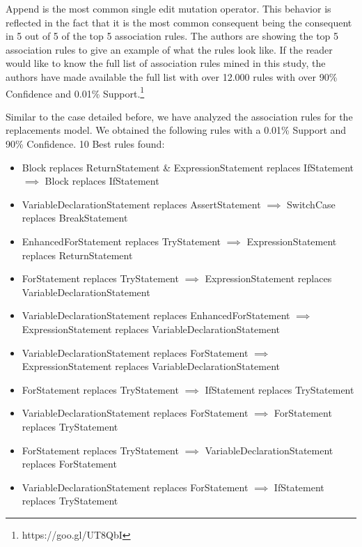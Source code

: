 \documentclass[conference]{IEEEtran}
\begin{document}
Append is the most common single edit mutation operator. This behavior is
reflected in the fact that it is the most common consequent being the consequent
in 5 out of 5 of the top 5 association rules. The authors are showing the top 5
association rules to give an example of what the rules look like. If the reader
would like to know the full list of association rules mined in this study, the
authors have made available the full list with over 12.000 rules with over 90\%
Confidence and 0.01\% Support.\footnote{https://goo.gl/UT8QbI} 

Similar to the case detailed before, we have analyzed the association rules for the replacements model. We obtained the following rules with a 0.01\% Support and 90\% Confidence.
10 Best rules found:
\begin{itemize}
\item Block replaces ReturnStatement \& ExpressionStatement replaces IfStatement $\implies$ Block replaces IfStatement
\item VariableDeclarationStatement replaces AssertStatement $\implies$ SwitchCase replaces BreakStatement
\item EnhancedForStatement replaces TryStatement $\implies$ ExpressionStatement replaces ReturnStatement
\item ForStatement replaces TryStatement $\implies$ ExpressionStatement replaces VariableDeclarationStatement
\item VariableDeclarationStatement replaces EnhancedForStatement $\implies$ ExpressionStatement replaces VariableDeclarationStatement
\item VariableDeclarationStatement replaces ForStatement $\implies$ ExpressionStatement replaces VariableDeclarationStatement
\item ForStatement replaces TryStatement $\implies$ IfStatement replaces TryStatement
\item VariableDeclarationStatement replaces ForStatement $\implies$ ForStatement replaces TryStatement
\item ForStatement replaces TryStatement $\implies$ VariableDeclarationStatement replaces ForStatement
\item VariableDeclarationStatement replaces ForStatement $\implies$ IfStatement replaces TryStatement
\end{itemize}
\end{document}
